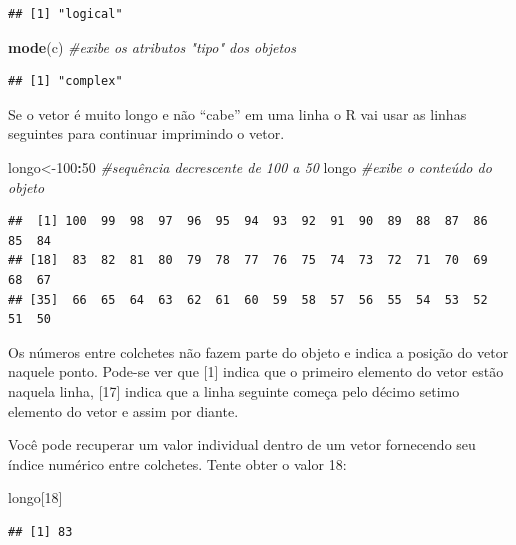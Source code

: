 \documentclass[]{book}
\newenvironment{Shaded}{\begin{snugshade}}{\end{snugshade}}
\newcommand{\CommentTok}[1]{\textcolor[rgb]{0.56,0.35,0.01}{\textit{#1}}}
\newcommand{\DecValTok}[1]{\textcolor[rgb]{0.00,0.00,0.81}{#1}}
\newcommand{\KeywordTok}[1]{\textcolor[rgb]{0.13,0.29,0.53}{\textbf{#1}}}
\newcommand{\NormalTok}[1]{#1}
\newcommand{\OperatorTok}[1]{\textcolor[rgb]{0.81,0.36,0.00}{\textbf{#1}}}
\begin{document}
\begin{verbatim}
## [1] "logical"
\end{verbatim}

\begin{Shaded}
\begin{Highlighting}[]
\KeywordTok{mode}\NormalTok{(c) }\CommentTok{#exibe os atributos "tipo" dos objetos }
\end{Highlighting}
\end{Shaded}

\begin{verbatim}
## [1] "complex"
\end{verbatim}

Se o vetor é muito longo e não ``cabe'' em uma linha o R vai usar as linhas seguintes para continuar imprimindo o vetor.

\begin{Shaded}
\begin{Highlighting}[]
\NormalTok{longo<-}\DecValTok{100}\OperatorTok{:}\DecValTok{50} \CommentTok{#sequência decrescente de 100 a 50}
\NormalTok{longo }\CommentTok{#exibe o conteúdo do objeto }
\end{Highlighting}
\end{Shaded}

\begin{verbatim}
##  [1] 100  99  98  97  96  95  94  93  92  91  90  89  88  87  86  85  84
## [18]  83  82  81  80  79  78  77  76  75  74  73  72  71  70  69  68  67
## [35]  66  65  64  63  62  61  60  59  58  57  56  55  54  53  52  51  50
\end{verbatim}

Os números entre colchetes não fazem parte do objeto e indica a posição do vetor naquele ponto. Pode-se ver que {[}1{]} indica que o primeiro elemento do vetor estão naquela linha, {[}17{]} indica que a linha seguinte começa pelo décimo setimo elemento do vetor e
assim por diante.

Você pode recuperar um valor individual dentro de um vetor fornecendo seu índice numérico entre colchetes. Tente obter o valor 18:

\begin{Shaded}
\begin{Highlighting}[]
\NormalTok{longo[}\DecValTok{18}\NormalTok{]}
\end{Highlighting}
\end{Shaded}

\begin{verbatim}
## [1] 83
\end{verbatim}
\end{document}
